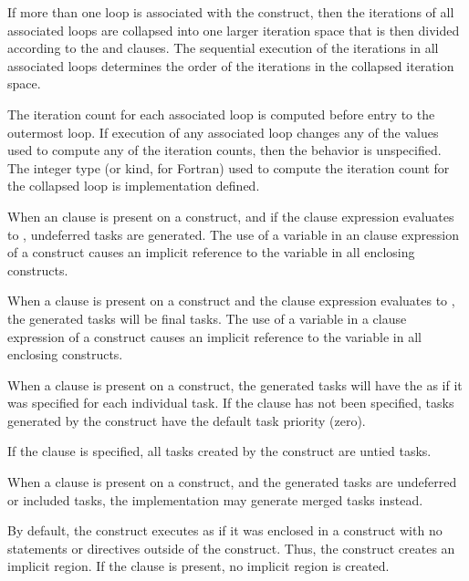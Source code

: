 If more than one loop is associated with the  construct, then the iterations of all associated loops are collapsed into one larger iteration space that is then divided according to the  and  clauses. The sequential execution of the iterations in all associated loops determines the order of the iterations in the collapsed iteration space.

The iteration count for each associated loop is computed before entry to the outermost loop. If execution of any associated loop changes any of the values used to compute any of the iteration counts, then the behavior is unspecified. The integer type (or kind, for Fortran) used to compute the iteration count for the collapsed loop is implementation defined.

When an  clause is present on a  construct, and if the  clause expression evaluates to , undeferred tasks are generated. The use of a variable in an  clause expression of a  construct causes an implicit reference to the variable in all enclosing constructs.

When a  clause is present on a  construct and the  clause expression evaluates to , the generated tasks will be final tasks. The use of a variable in a  clause expression of a  construct causes an implicit reference to the variable in all enclosing constructs.

When a  clause is present on a  construct,
the generated tasks will have the  as if it was 
specified for each individual task.  
If the  clause has not been specified, tasks generated by 
the  construct have the default task priority (zero).

If the  clause is specified, all tasks created by the  construct are untied tasks.

When a  clause is present on a  construct, and the generated tasks are undeferred or included tasks, the implementation may generate merged tasks instead.

By default, the  construct executes as if it was enclosed in a  construct with no statements or directives outside of the  construct. Thus, the  construct creates an implicit  region. If the  clause is present, no implicit  region is created.

